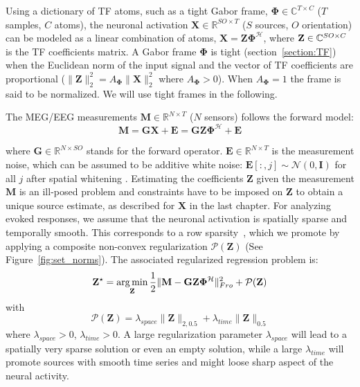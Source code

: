 Using a dictionary of TF atoms, such as a tight Gabor frame, $\mathbf{\Phi} \in \mathbb{C}^{T \times C}$ ($T$ samples, $C$ atoms), the neuronal activation $\mathbf{X} \in \mathbb{R}^{SO \times T}$ ($S$ sources, $O$ orientation) can be modeled as a linear combination of atoms, $\mathbf{X}=\mathbf{Z\Phi}^{\mathcal{H}}$, where $\mathbf{Z} \in \mathbb{C}^{SO \times C}$ is the TF coefficients matrix. A Gabor frame $\mathbf{\Phi}$ is tight (section~\ref{section:TF}) when the Euclidean norm of the input signal and the vector of TF coefficients are proportional ($\|\mathbf{Z}\|_2^2 = A_\mathbf{\Phi} \|\mathbf{X}\|_2^2$ where $A_\mathbf{\Phi}>0$). When $A_\mathbf{\Phi}=1$ the frame is said to be normalized. We will use tight frames in the following.

The MEG/EEG measurements $\mathbf{M} \in \mathbb{R}^{N \times T}$ ($N$ sensors) follows the forward model:
\begin{equation} \label{eq:reg_prob_tf}
    \mathbf{M} = \mathbf{GX} + \mathbf{E} = \mathbf{GZ \Phi}^{\mathcal{H}} + \mathbf{E}
\end{equation}

where $\mathbf{G} \in \mathbb{R}^{N \times SO}$ stands for the forward operator. $\mathbf{E} \in \mathbb{R}^{N \times T}$ is the measurement noise, which can be assumed to be additive white noise: $\mathbf{E}[:, j] \sim \mathcal{N}(0, \mathbf{I})$ for all $j$ after spatial whitening \cite{denis}. Estimating the coefficients $\mathbf{Z}$ given the measurement $\mathbf{M}$ is an ill-posed problem and constraints have to be imposed on $\mathbf{Z}$ to obtain a unique source estimate, as described for $\mathbf{X}$ in the last chapter. For analyzing evoked responses, we assume that the neuronal activation is spatially sparse and temporally smooth. This corresponds to a row sparsity~\cite{Alex13}, which we promote by applying a composite non-convex regularization $\mathcal{P}(\mathbf{Z})$ (See Figure~\ref{fig:set_norms}). The associated regularized regression problem is:
\begin{equation} \label{eq:penalized_reg_tf}
    \mathbf{Z}^\star = \mathop{\mathrm{arg}\,\mathrm{min}}_{\mathbf{Z}} \frac{1}{2}\|\mathbf{M - GZ\Phi^\mathcal{H}}\|^2_{Fro} + \mathcal{P}(\mathbf{Z})
\end{equation}
with
\begin{equation}
	\mathcal{P}(\mathbf{Z}) = \lambda_{space}\|\mathbf{Z}\|_{2,0.5} + \lambda_{time}\|\mathbf{Z}\|_{0.5}
\end{equation}
where $\lambda_{space} > 0$, $\lambda_{time}>0$. A large regularization parameter $\lambda_{space}$ will lead to a spatially very sparse solution or even an empty solution, while a large $\lambda_{time}$ will promote sources with smooth time series and might loose sharp aspect of the neural activity.

